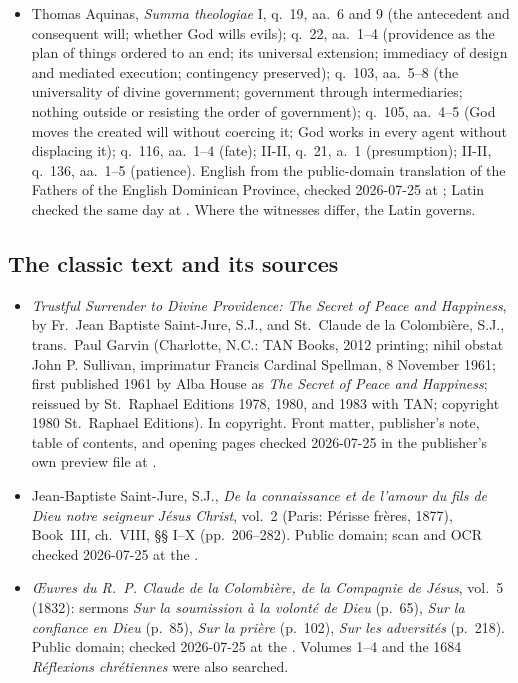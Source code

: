 {\fontsize{8.6}{9.6}\selectfont
\begin{itemize}[itemsep=0pt,parsep=0pt,topsep=0.05em]
\item Thomas Aquinas, \emph{Summa theologiae} I, q.~19, aa.~6 and 9 (the antecedent and consequent will; whether God wills evils); q.~22, aa.~1--4 (providence as the plan of things ordered to an end; its universal extension; immediacy of design and mediated execution; contingency preserved); q.~103, aa.~5--8 (the universality of divine government; government through intermediaries; nothing outside or resisting the order of government); q.~105, aa.~4--5 (God moves the created will without coercing it; God works in every agent without displacing it); q.~116, aa.~1--4 (fate); II-II, q.~21, a.~1 (presumption); II-II, q.~136, aa.~1--5 (patience). English from the public-domain translation of the Fathers of the English Dominican Province, checked 2026-07-25 at ; Latin checked the same day at . Where the witnesses differ, the Latin governs.
\end{itemize}}

\subsection*{The classic text and its sources}

{\fontsize{8.6}{9.6}\selectfont
\begin{itemize}[itemsep=0pt,parsep=0pt,topsep=0.05em]
\item \emph{Trustful Surrender to Divine Providence: The Secret of Peace and Happiness}, by Fr.~Jean Baptiste Saint-Jure, S.J., and St.~Claude de la Colombière, S.J., trans.\ Paul Garvin (Charlotte, N.C.: TAN Books, 2012 printing; nihil obstat John P. Sullivan, imprimatur Francis Cardinal Spellman, 8 November 1961; first published 1961 by Alba House as \emph{The Secret of Peace and Happiness}; reissued by St.~Raphael Editions 1978, 1980, and 1983 with TAN; copyright 1980 St.~Raphael Editions). In copyright. Front matter, publisher's note, table of contents, and opening pages checked 2026-07-25 in the publisher's own preview file at .
\item Jean-Baptiste Saint-Jure, S.J., \emph{De la connaissance et de l'amour du fils de Dieu notre seigneur Jésus Christ}, vol.~2 (Paris: Périsse frères, 1877), Book~III, ch.~VIII, §§ I--X (pp.~206--282). Public domain; scan and OCR checked 2026-07-25 at the .
\item \emph{Œuvres du R.~P. Claude de la Colombière, de la Compagnie de Jésus}, vol.~5 (1832): sermons \emph{Sur la soumission à la volonté de Dieu} (p.~65), \emph{Sur la confiance en Dieu} (p.~85), \emph{Sur la prière} (p.~102), \emph{Sur les adversités} (p.~218). Public domain; checked 2026-07-25 at the . Volumes 1--4 and the 1684 \emph{Réflexions chrétiennes} were also searched.
\end{itemize}}

